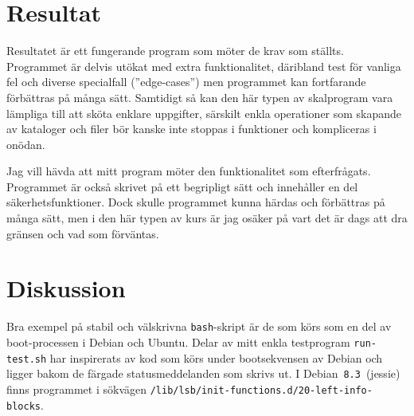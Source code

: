 %
%
%


\section{Resultat}
Resultatet är ett fungerande program som möter de krav som ställts.
Programmet är delvis utökat med extra funktionalitet, däribland test för vanliga
fel och diverse specialfall (''edge-cases'') men programmet kan fortfarande 
förbättras på många sätt. Samtidigt så kan den här typen av skalprogram vara
lämpliga till att sköta enklare uppgifter, särskilt enkla operationer som 
skapande av kataloger och filer bör kanske inte stoppas i funktioner och
kompliceras i onödan.

Jag vill hävda att mitt program möter den funktionalitet som efterfrågats.
Programmet är också skrivet på ett begripligt sätt och innehåller en del
säkerhetsfunktioner. Dock skulle programmet kunna härdas och förbättras på
många sätt, men i den här typen av kurs är jag osäker på vart det är dags 
att dra gränsen och vad som förväntas.


\section{Diskussion}
Bra exempel på stabil och välskrivna \texttt{bash}-skript är de som körs som en
del av boot-processen i Debian och Ubuntu. Delar av mitt enkla testprogram
\texttt{run-test.sh} har inspirerats av kod som körs under bootsekvensen av
Debian och ligger bakom de färgade statusmeddelanden som skrivs ut. I
\mbox{Debian \texttt{8.3} (jessie)} finns programmet i sökvägen
\smaller\texttt{/lib/lsb/init-functions.d/20-left-info-blocks}.

